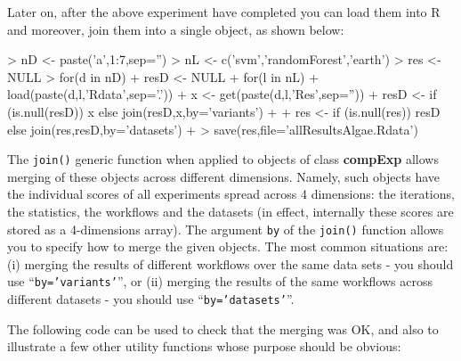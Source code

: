 \documentclass[10pt,a4paper]{article}
\begin{document}
Later on, after the above experiment have completed you can load them
into R and moreover, join them into a single object, as shown below:

\begin{Schunk}
\begin{Sinput}
> nD <- paste('a',1:7,sep='')
> nL <- c('svm','randomForest','earth')
> res <- NULL
> for(d in nD) {
+   resD <- NULL
+   for(l in nL) {
+     load(paste(d,l,'Rdata',sep='.'))
+     x <- get(paste(d,l,'Res',sep=''))
+     resD <- if (is.null(resD)) x else join(resD,x,by='variants')
+   }
+   res <- if (is.null(res)) resD else join(res,resD,by='datasets')
+ }
> save(res,file='allResultsAlgae.Rdata')
\end{Sinput}
\end{Schunk}

The \texttt{join()} generic function when applied to objects of class
\textbf{compExp} allows merging of these objects across different
dimensions. Namely, such objects have the individual scores of all
experiments spread across 4 dimensions: the iterations, the
statistics, the workflows and the datasets (in effect, internally
these scores are stored as a 4-dimensions array). The argument
\texttt{by} of the \texttt{join()} function allows you to specify how
to merge the given objects. The most common situations are: (i)
merging the results of different workflows over the same data sets -
you should use ``\texttt{by='variants'}'', or (ii) merging the results
of the same workflows across different datasets - you should use
``\texttt{by='datasets'}''.

The following code can be used to check that the merging was OK, and
also to illustrate a few other utility functions whose purpose should
be obvious:
\end{document}
